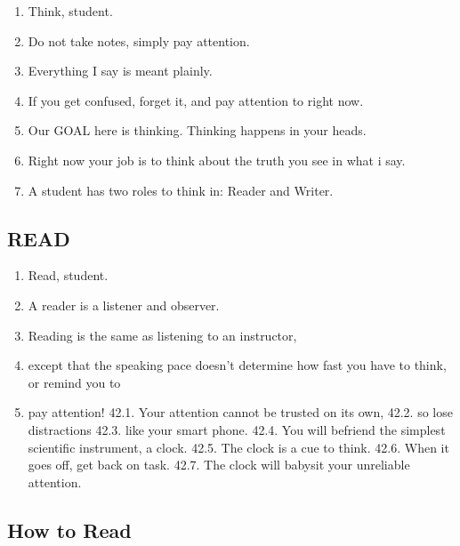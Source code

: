 \documentclass[
]{book}
\providecommand{\tightlist}{%
  \setlength{\itemsep}{0pt}\setlength{\parskip}{0pt}}
\begin{document}
\begin{enumerate}
\def\labelenumi{\arabic{enumi}.}
\setcounter{enumi}{30}
\tightlist
\item
  Think, student.
\item
  Do not take notes, simply pay attention.
\item
  Everything I say is meant plainly.
\item
  If you get confused, forget it, and pay attention to right now.
\item
  Our GOAL here is thinking. Thinking happens in your heads.
\item
  Right now your job is to think about the truth you see in what i say.
\item
  A student has two roles to think in: Reader and Writer.
\end{enumerate}

\hypertarget{read}{%
\subsection{READ}\label{read}}

\begin{enumerate}
\def\labelenumi{\arabic{enumi}.}
\setcounter{enumi}{37}
\tightlist
\item
  Read, student.
\item
  A reader is a listener and observer.
\item
  Reading is the same as listening to an instructor,
\item
  except that the speaking pace doesn't determine how fast you have to think, or
  remind you to
\item
  pay attention!
  42.1. Your attention cannot be trusted on its own,
  42.2. so lose distractions
  42.3. like your smart phone.
  42.4. You will befriend the simplest scientific instrument, a clock.
  42.5. The clock is a cue to think.
  42.6. When it goes off, get back on task.
  42.7. The clock will babysit your unreliable attention.
\end{enumerate}

\hypertarget{how-to-read}{%
\subsection{How to Read}\label{how-to-read}}
\end{document}
